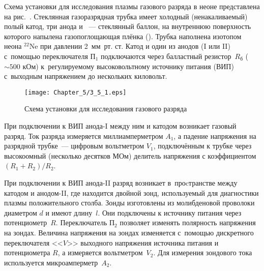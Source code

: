 



Схема установки для исследования плазмы газового разряда в неоне представлена на рис.~. Стеклянная газоразрядная
трубка имеет холодный (ненакаливаемый) полый катод, три анода и ~--- стеклянный баллон, на
внутреннюю поверхность которого напылена газопоглощающая плёнка (). Трубка наполнена изотопом неона 
$^{22}$Ne при давлении 2~мм~рт. ст. Катод и один из анодов (I или II) с~помощью переключателя $\text{П}_1$ подключаются через
балластный резистор~$R_\text{б}$ ($\sim500$ кОм) к~регулируемому высоковольтному источнику питания (ВИП) с~выходным
напряжением до нескольких киловольт.

\begin{figure}[h!]
	\texttt{[image: Chapter\_5/3\_5\_1.eps]}
	\caption{Схема установки для исследования газового разряда}
\end{figure}

При подключении к ВИП анода-I между ним и катодом возникает газовый разряд. Ток разряда измеряется миллиамперметром
$A_1$, а падение напряжения на разрядной трубке~--- цифровым вольтметром $V_{1}$, подключённым к трубке через
высокоомный (несколько десятков МОм) делитель напряжения с коэффициентом $(R_1+R_2)/R_2$.

При подключении к ВИП анода-II разряд возникает в~проcтранстве между катодом и анодом-II, где находится двойной зонд,
используемый для диагностики плазмы положительного столба. Зонды изготовлены из молибденовой проволоки диаметром
$d$ и имеют длину~$l$. Они подключены к источнику питания через потенциометр~$R$. Переключатель
$\text{П}_2$ позволяет изменять полярность напряжения на зондах. Величина напряжения на зондах изменяется с~помощью дискретного
переключателя <<$V$>> выходного напряжения источника питания и потенциометра $R$, а измеряется вольтметром~$V_2$. Для
измерения зондового тока используется микроамперметр~$A_2$.

